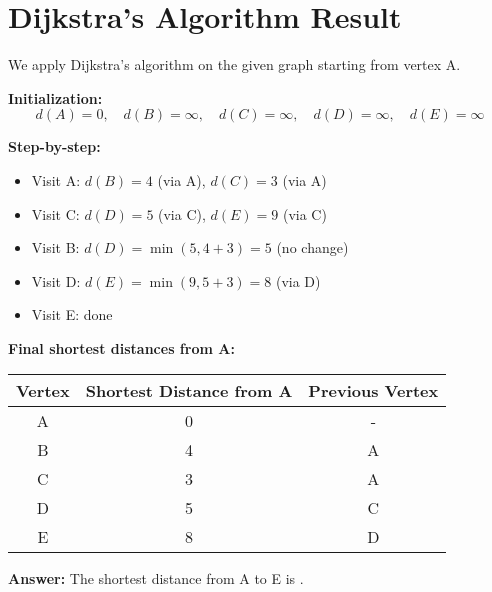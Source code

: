 \documentclass[a4paper]{article}
\begin{document}
\small

\section*{Dijkstra's Algorithm Result}

We apply Dijkstra's algorithm on the given graph starting from vertex A.

\textbf{Initialization:}
\[
d(A)=0,\quad d(B)=\infty,\quad d(C)=\infty,\quad d(D)=\infty,\quad d(E)=\infty
\]

\textbf{Step-by-step:}
\begin{itemize}
  \item Visit A: 
  $d(B) = 4$ (via A), $d(C) = 3$ (via A)
  \item Visit C: 
  $d(D) = 5$ (via C), $d(E) = 9$ (via C)
  \item Visit B: 
  $d(D) = \min(5, 4 + 3) = 5$ (no change)
  \item Visit D: 
  $d(E) = \min(9, 5 + 3) = 8$ (via D)
  \item Visit E: done
\end{itemize}

\vspace{0.3cm}
\textbf{Final shortest distances from A:}

\begin{center}
\begin{tabular}{ccc}
\toprule
\textbf{Vertex} & \textbf{Shortest Distance from A} & \textbf{Previous Vertex} \\
\midrule
A & 0 & - \\
B & 4 & A \\
C & 3 & A \\
D & 5 & C \\
E & 8 & D \\
\bottomrule
\end{tabular}
\end{center}

\vspace{0.3cm}
\textbf{Answer:} The shortest distance from A to E is .
\end{document}
